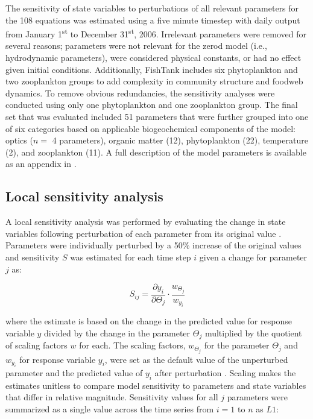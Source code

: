 \documentclass[preprint]{elsarticle}\usepackage[]{graphicx}\usepackage[]{color}
\begin{document}
The sensitivity of state variables to perturbations of all relevant parameters for the 108 equations was estimated using a five minute timestep with daily output from January 1\textsuperscript{st} to December 31\textsuperscript{st}, 2006. Irrelevant parameters were removed for several reasons; parameters were not relevant for the \ac{zerod} model (i.e., hydrodynamic parameters), were considered physical constants, or had no effect given initial conditions.  Additionally, FishTank includes six phytoplankton and two zooplankton groups to add complexity in community structure and foodweb dynamics. To remove obvious redundancies, the sensitivity analyses were conducted using only one phytoplankton and one zooplankton group.  The final set that was evaluated included 51 parameters that were further grouped into one of six categories based on applicable biogeochemical components of the model: optics ($n = $ 4 parameters), organic matter (12), phytoplankton (22), temperature (2), and zooplankton (11).  A full description of the model parameters is available as an appendix in .  

\subsection{Local sensitivity analysis}

A local sensitivity analysis was performed by evaluating the change in state variables following perturbation of each parameter from its original value \citep{Soetaert10,RDCT17}. Parameters were individually perturbed by a 50\% increase of the original values and sensitivity $S$ was estimated for each time step $i$ given a change for parameter $j$ as:

\begin{equation} \label{sijeqn}
S_{ij} = \frac{\partial y_i}{\partial \Theta_j}\cdot\frac{w_{\Theta_j}}{w_{y_i}}
\end{equation}

\noindent where the estimate is based on the change in the predicted value for response variable $y$ divided by the change in the parameter $\Theta_j$ multiplied by the quotient of scaling factors $w$ for each.  The scaling factors, $w_{\Theta_j}$ for the parameter $\Theta_j$ and $w_{y_i}$ for response variable $y_i$, were set as the default value of the unperturbed parameter and the predicted value of $y_i$ after perturbation \citep{Soetaert10}.  Scaling makes the estimates unitless to compare model sensitivity to parameters and state variables that differ in relative magnitude.  Sensitivity values for all $j$ parameters were summarized as a single value across the time series from $i = 1$ to $n$ as $L1$:
\end{document}
